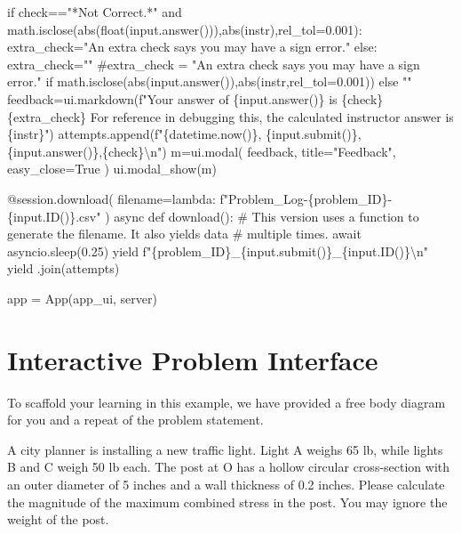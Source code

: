 \documentclass[
  letterpaper,
  DIV=11,
  numbers=noendperiod]{scrreprt}
\newenvironment{Shaded}{\begin{snugshade}}{\end{snugshade}}
\newcommand{\NormalTok}[1]{\textcolor[rgb]{0.00,0.23,0.31}{#1}}
\begin{document}
\begin{Shaded}
\begin{Highlighting}[]
\NormalTok{        if check=="*Not Correct.*" and math.isclose(abs(float(input.answer())),abs(instr),rel\_tol=0.001):}
\NormalTok{           extra\_check="An extra check says you may have a sign error."}
\NormalTok{        else:}
\NormalTok{           extra\_check=""}
\NormalTok{        \#extra\_check = "An extra check says you may have a sign error." if math.isclose(abs(input.answer()),abs(instr,rel\_tol=0.001)) else ""}
\NormalTok{        feedback=ui.markdown(f"Your answer of \{input.answer()\} is \{check\} \{extra\_check\} For reference in debugging this, the calculated instructor answer is \{instr\}")}
\NormalTok{        attempts.append(f"\{datetime.now()\}, \{input.submit()\},\{input.answer()\},\{check\}\textbackslash{}n")}
\NormalTok{        m=ui.modal(}
\NormalTok{          feedback,}
\NormalTok{          title="Feedback",}
\NormalTok{          easy\_close=True}
\NormalTok{        )}
\NormalTok{        ui.modal\_show(m)}
        
\NormalTok{    @session.download(}
\NormalTok{        filename=lambda: f"Problem\_Log{-}\{problem\_ID\}{-}\{input.ID()\}.csv"}
\NormalTok{    )}
\NormalTok{    async def download():}
\NormalTok{        \# This version uses a function to generate the filename. It also yields data}
\NormalTok{        \# multiple times.}
\NormalTok{        await asyncio.sleep(0.25)}
\NormalTok{        yield f"\{problem\_ID\}\_\{input.submit()\}\_\{input.ID()\}\textbackslash{}n"}
\NormalTok{        yield \textquotesingle{}\textquotesingle{}.join(attempts)}
           

\NormalTok{app = App(app\_ui, server)}
\end{Highlighting}
\end{Shaded}

\chapter*{Interactive Problem
Interface}\label{interactive-problem-interface}


To scaffold your learning in this example, we have provided a free body
diagram for you and a repeat of the problem statement.

A city planner is installing a new traffic light. Light A weighs 65 lb,
while lights B and C weigh 50 lb each. The post at O has a hollow
circular cross-section with an outer diameter of 5 inches and a wall
thickness of 0.2 inches. Please calculate the magnitude of the maximum
combined stress in the post. You may ignore the weight of the post.
\end{document}
